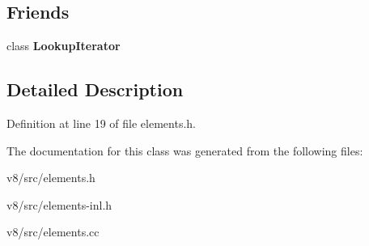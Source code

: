 \subsection*{Friends}
\begin{DoxyCompactItemize}
\item 
\mbox{\label{classv8_1_1internal_1_1ElementsAccessor_a44f614b48d67bab95d53634a26593e69}} 
class {\bfseries Lookup\+Iterator}
\end{DoxyCompactItemize}


\subsection{Detailed Description}


Definition at line 19 of file elements.\+h.



The documentation for this class was generated from the following files\+:\begin{DoxyCompactItemize}
\item 
v8/src/elements.\+h\item 
v8/src/elements-\/inl.\+h\item 
v8/src/elements.\+cc\end{DoxyCompactItemize}
